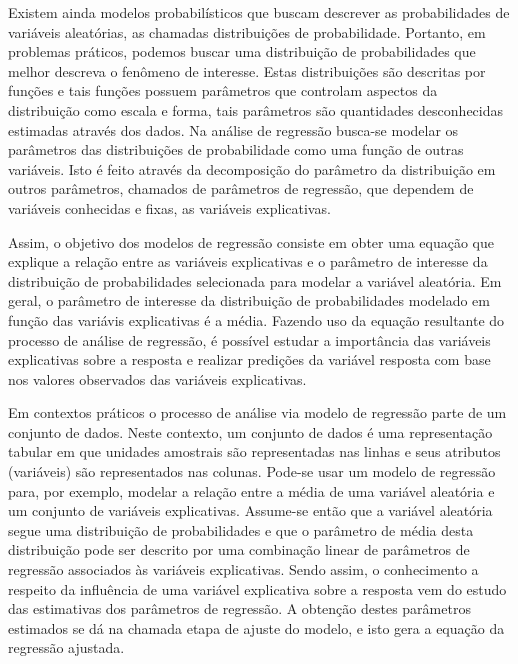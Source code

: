 Existem ainda modelos probabilísticos que buscam descrever as probabilidades de variáveis aleatórias, as chamadas distribuições de probabilidade. Portanto, em problemas práticos, podemos buscar uma distribuição de probabilidades que melhor descreva o fenômeno de interesse. Estas distribuições são descritas por funções e tais funções possuem parâmetros que controlam aspectos da distribuição como escala e forma, tais parâmetros são quantidades desconhecidas estimadas através dos dados. Na análise de regressão busca-se modelar os parâmetros das distribuições de probabilidade como uma função de outras variáveis. Isto é feito através da decomposição do parâmetro da distribuição em outros parâmetros, chamados de parâmetros de regressão, que dependem de variáveis conhecidas e fixas, as variáveis explicativas. 

Assim, o objetivo dos modelos de regressão consiste em obter uma equação que explique a relação entre as variáveis explicativas e o parâmetro de interesse da distribuição de probabilidades selecionada para modelar a variável aleatória. Em geral, o parâmetro de interesse da distribuição de probabilidades modelado em função das variávis explicativas é a média. Fazendo uso da equação resultante do processo de análise de regressão, é possível estudar a importância das variáveis explicativas sobre a resposta e realizar predições da variável resposta com base nos valores observados das variáveis explicativas. 

Em contextos práticos o processo de análise via modelo de regressão parte de um conjunto de dados. Neste contexto, um conjunto de dados é uma representação tabular em que unidades amostrais são representadas nas linhas e seus atributos (variáveis) são representados nas colunas. Pode-se usar um modelo de regressão para, por exemplo, modelar a relação entre a média de uma variável aleatória e um conjunto de variáveis explicativas. Assume-se então que a variável aleatória segue uma distribuição de probabilidades e que o parâmetro de média desta distribuição pode ser descrito por uma combinação linear de parâmetros de regressão associados às variáveis explicativas. Sendo assim, o conhecimento a respeito da influência de uma variável explicativa sobre a resposta vem do estudo das estimativas dos parâmetros de regressão. A obtenção destes parâmetros estimados se dá na chamada etapa de ajuste do modelo, e isto gera a equação da regressão ajustada.

